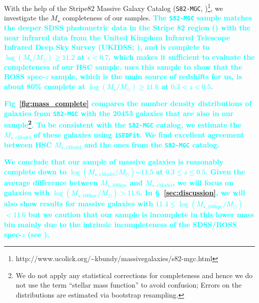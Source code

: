 \documentclass[a4paper,fleqn,usenatbib]{mnras}
\def\msun{$M_\odot$}
\def\mstar{{$M_{\star}$}}
\def\logms{{$\log (M_{\star}/M_{\odot})$}}
\def\mtot{{$M_{\star,100\mathrm{kpc}}$}}
\def\mcmodel{{$M_{\star,\mathrm{cModel}}$}}
\def\logmtot{{$\log (M_{\star,100\mathrm{kpc}}/M_{\odot})$}}
\def\logmcmodel{{$\log (M_{\star,\mathrm{cModel}}/M_{\odot})$}}
\newcommand{\song}[1]{\textcolor{cyan}{\textbf{#1}}}
\begin{document}
    With the help of the Stripe82 Massive Galaxy Catalog (\texttt{S82-MGC},
    \citealt{Bundy2015}
    )\footnote{http://www.ucolick.org/\~{}kbundy/massivegalaxies/s82-mgc.html}, 
    we investigate the \mstar{} completeness of our samples. 
    \song{
    The \texttt{S82-MGC} sample matches the deeper SDSS photometric data in the 
    Stripe 82 region (\citealt{Annis2014}) with the near infrared data from the United 
    Kingdom Infrared Telescope Infrared Deep Sky Survey (UKIDSS; 
    \citealt{Lawrence2007}), and is complete to \logms{}$\geq 11.2$ at $z<0.7$. 
    which makes it sufficient to evaluate the completeness of our HSC sample. 
    \citet{Leauthaud2016} uses this sample to show that the BOSS spec-$z$ sample, 
    which is the main source of redshifts for us, is about 80\% complete at 
    \logms{}$\geq 11.6$ at $0.3 < z < 0.5$.
    } 
    
    \song{
    Fig~\ref{fig:mass_complete} compares the number density distributions of 
    galaxies from \texttt{S82-MGC} with the 20453 galaxies that are also in 
    our sample\footnote{We do not apply any statistical corrections for completeness 
    and hence we do not use the term ``stellar mass function'' to avoid confusion;
    Errors on the distributions are estimated via bootstrap resampling.}.
    To be consistent with the \texttt{S82-MGC} catalog, we estimate the \mcmodel{}
    of these galaxies using \texttt{iSEDFit}.
    We find excellent agreement between HSC \mcmodel{} and the ones from the
    \texttt{S82-MGC} catalog.
    }

    
    \song{
    We conclude that our sample of massive galaxies is reasonably complete down 
    to \logmcmodel{}${\sim} 11.5$ at $0.3 \leq z \leq 0.5$.    
    Given the average difference between \mtot{} and \mcmodel{}, we will focus on 
    galaxies with \logmtot{}$> 11.6$. 
    In \S~\ref{sec:discussion}, we will also show results for massive galaxies 
    with $11.4 \le$\logmtot{}$<11.6$ but we caution that our sample is incomplete 
    in this lower mass bin mainly due to the intrinsic incompleteness of the 
    SDSS/BOSS spec-$z$ (see \citealt{Leauthaud2016}).
    }
    
\end{document}
